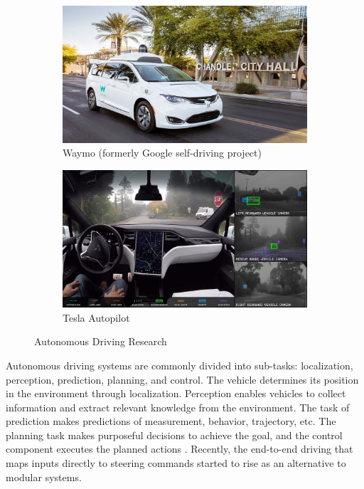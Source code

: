 \begin{figure}[H]
\centering
\begin{subfigure}[b]{0.485\textwidth}
    \centering
    \includegraphics[width=\textwidth]{figures/chapter_intro/waymo.jpg}
    \caption{Waymo (formerly Google self-driving project)}
    \label{fig:waymo}
\end{subfigure}
\hfill
\begin{subfigure}[b]{0.485\textwidth}
    \centering
    \includegraphics[width=\textwidth]{figures/chapter_intro/tesla_autopilot.jpg}
    \caption{Tesla Autopilot}
    \label{fig:tesla}
\end{subfigure}
\hfill
\caption{Autonomous Driving Research}
\label{fig.autonomous}
\end{figure}

Autonomous driving systems are commonly divided into sub-tasks: localization, perception, prediction, planning, and control. The vehicle determines its position in the environment through localization. Perception enables vehicles to collect information and extract relevant knowledge from the environment. The task of prediction makes predictions of measurement, behavior, trajectory, etc. The planning task makes purposeful decisions to achieve the goal, and the control component executes the planned actions \cite{pendleton2017perception}. Recently, the end-to-end driving that maps inputs directly to steering commands started to rise as an alternative to modular systems.

